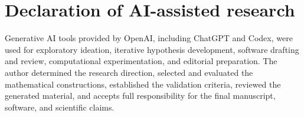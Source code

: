 \documentclass[11pt]{article}
\theoremstyle{definition}
\begin{document}
\section*{Declaration of AI-assisted research}
Generative AI tools provided by OpenAI, including ChatGPT and Codex, were used
for exploratory ideation, iterative hypothesis development, software drafting
and review, computational experimentation, and editorial preparation. The
author determined the research direction, selected and evaluated the
mathematical constructions, established the validation criteria, reviewed the
generated material, and accepts full responsibility for the final manuscript,
software, and scientific claims.



\end{document}
